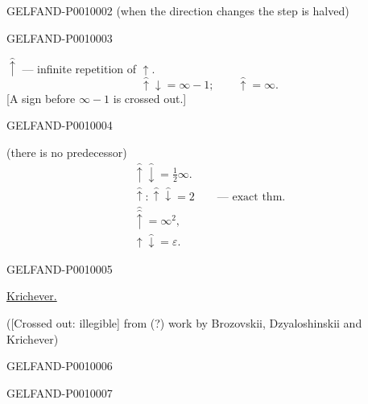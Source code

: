 \begin{GelfandAdjacentEvidence}{GELFAND-P001000}{2}
(when the direction changes the step is halved)
\end{GelfandAdjacentEvidence}
\begin{GelfandAdjacentEvidence}{GELFAND-P001000}{3}


$\hat{\uparrow}$ --- infinite repetition of $\uparrow$.
\[
\hat{\uparrow}\downarrow=\infty-1;\qquad
\hat{\uparrow}=\infty.
\]
[A sign before $\infty-1$ is crossed out.]
\end{GelfandAdjacentEvidence}
\begin{GelfandAdjacentEvidence}{GELFAND-P001000}{4}

(there is no predecessor)
\begin{gather*}
\hat{\uparrow}\hat{\downarrow}=\frac12\infty.\\
\hat{\uparrow}:\hat{\uparrow}\hat{\downarrow}=2
\qquad\text{--- exact thm.}\\
\hat{\hat{\uparrow}}=\infty^2,\\
\uparrow\hat{\downarrow}=\varepsilon.
\end{gather*}
\end{GelfandAdjacentEvidence}
\begin{GelfandAdjacentEvidence}{GELFAND-P001000}{5}


\underline{Krichever.}

([Crossed out: illegible] from (?) work by Brozovskii, Dzyaloshinskii and Krichever)
\end{GelfandAdjacentEvidence}
\begin{GelfandAdjacentEvidence}{GELFAND-P001000}{6}

\end{GelfandAdjacentEvidence}
\begin{GelfandAdjacentEvidence}{GELFAND-P001000}{7}

\end{GelfandAdjacentEvidence}
